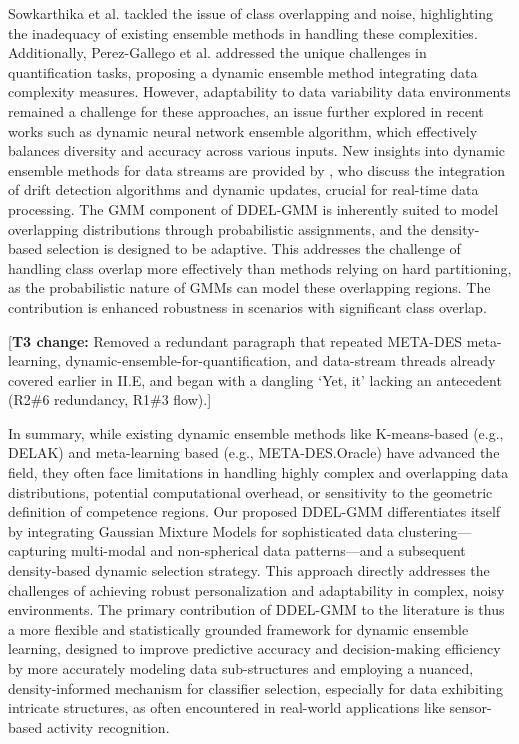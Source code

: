 \documentclass[lettersize,journal]{IEEEtran}
\newcommand{\greenhighlight}[1]{\textcolor{highlightgreen}{#1}}
\newcommand{\tnote}[1]{\textcolor{tier3note}{\footnotesize[\textbf{T3 change:} #1]}}
\begin{document}
Sowkarthika et al. \cite{b_data_2023} tackled the issue of class overlapping and noise, highlighting the inadequacy of existing ensemble methods in handling these complexities. Additionally, Perez-Gallego et al. \cite{perez-gallego_dynamic_2019} addressed the unique challenges in quantification tasks, proposing a dynamic ensemble method integrating data complexity measures. However, adaptability to data variability data environments remained a challenge for these approaches, an issue further explored in recent works such as \cite{alam_dynamic_2020} dynamic neural network ensemble algorithm, which effectively balances diversity and accuracy across various inputs. New insights into dynamic ensemble methods for data streams are provided by \cite{gomes_survey_2017}, who discuss the integration of drift detection algorithms and dynamic updates, crucial for real-time data processing. \greenhighlight{The GMM component of DDEL-GMM is inherently suited to model overlapping distributions through probabilistic assignments, and the density-based selection is designed to be adaptive. This addresses the challenge of handling class overlap more effectively than methods relying on hard partitioning, as the probabilistic nature of GMMs can model these overlapping regions. The contribution is enhanced robustness in scenarios with significant class overlap.}

\tnote{Removed a redundant paragraph that repeated META-DES meta-learning, dynamic-ensemble-for-quantification, and data-stream threads already covered earlier in II.E, and began with a dangling `Yet, it' lacking an antecedent (R2\#6 redundancy, R1\#3 flow).}

\greenhighlight{In summary, while existing dynamic ensemble methods like K-means-based (e.g., DELAK) and meta-learning based (e.g., META-DES.Oracle) have advanced the field, they often face limitations in handling highly complex and overlapping data distributions, potential computational overhead, or sensitivity to the geometric definition of competence regions. Our proposed DDEL-GMM differentiates itself by integrating Gaussian Mixture Models for sophisticated data clustering—capturing multi-modal and non-spherical data patterns—and a subsequent density-based dynamic selection strategy. This approach directly addresses the challenges of achieving robust personalization and adaptability in complex, noisy environments. The primary contribution of DDEL-GMM to the literature is thus a more flexible and statistically grounded framework for dynamic ensemble learning, designed to improve predictive accuracy and decision-making efficiency by more accurately modeling data sub-structures and employing a nuanced, density-informed mechanism for classifier selection, especially for data exhibiting intricate structures, as often encountered in real-world applications like sensor-based activity recognition.}
\end{document}
